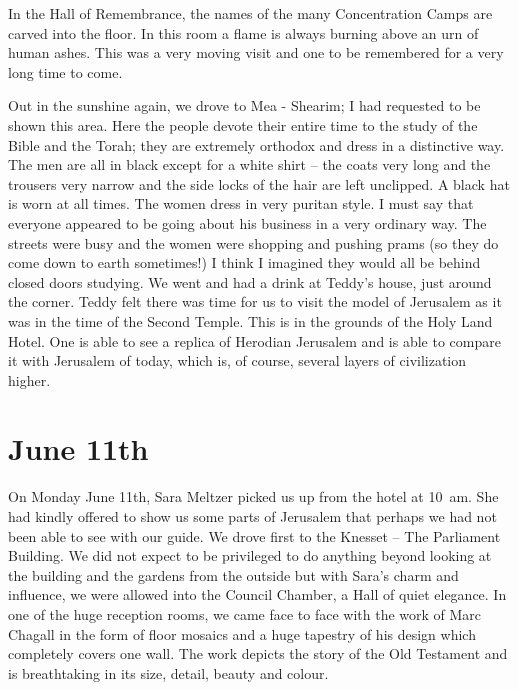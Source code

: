 In the Hall of Remembrance, the names of the many Concentration Camps
are carved into the floor. In this room a flame is always burning
above an urn of human ashes. This was a very moving visit and one to
be remembered for a very long time to come.

Out in the sunshine again, we drove to Mea - Shearim; I had requested
to be shown this area. Here the people devote their entire time to the
study of the Bible and the Torah; they are extremely orthodox and
dress in a distinctive way. The men are all in black except for a
white shirt -- the coats very long and the trousers very narrow and
the side locks of the hair are left unclipped. A black hat is worn at
all times. The women dress in very puritan style. I must say that
everyone appeared to be going about his business in a very ordinary
way. The streets were busy and the women were shopping and pushing
prams (so they do come down to earth sometimes!) I think I imagined
they would all be behind closed doors studying. We went and had a
drink at Teddy's house, just around the corner. Teddy felt there was
time for us to visit the model of Jerusalem as it was in the time of
the Second Temple. This is in the grounds of the Holy Land Hotel. One
is able to see a replica of Herodian Jerusalem and is able to compare
it with Jerusalem of today, which is, of course, several layers of
civilization higher.

\section{June 11th}

On Monday June 11th, Sara Meltzer picked us up from the hotel at
10~am. She had kindly offered to show us some parts of Jerusalem that
perhaps we had not been able to see with our guide. We drove first to
the Knesset -- The Parliament Building. We did not expect to be
privileged to do anything beyond looking at the building and the
gardens from the outside but with Sara's charm and influence, we were
allowed into the Council Chamber, a Hall of quiet elegance. In one of
the huge reception rooms, we came face to face with the work of Marc
Chagall in the form of floor mosaics and a huge tapestry of his design
which completely covers one wall. The work depicts the story of the
Old Testament and is breathtaking in its size, detail, beauty and
colour.

